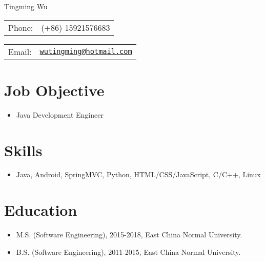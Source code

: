 \documentclass[letterpaper, UTF8]{article}
\def\name{Tingming Wu}
\begin{document}
	
	{\huge \name}
	
	
	\vspace{0.15in}  %
	
	\begin{minipage}{0.45\linewidth}
		\begin{tabular}{ll}
			Phone: & (+86) 15921576683 \\
		\end{tabular}
	\end{minipage}
	\begin{minipage}{0.45\linewidth}
		\begin{tabular}{ll}
			Email: & \href{mailto:wutingming@hotmail.com}{\tt wutingming@hotmail.com} \\
		\end{tabular}
	\end{minipage}
	\vspace{-0.1in}
	
	\section*{\textbf{Job Objective}}\vspace{-0.05in}
	\begin{itemize}
		\item Java Development Engineer
	\end{itemize}
	\vspace{-0.25in}
	
	\section*{\textbf{Skills}}\vspace{-0.05in}
	\begin{itemize}
		\item Java, Android, SpringMVC, Python, HTML/CSS/JavaScript, C/C++, Linux
	\end{itemize}
	\vspace{-0.32in}
	
	\section*{\textbf{Education}}\vspace{-0.05in}
	\begin{itemize}
		\item M.S. (Software Engineering), 2015-2018, East China Normal University.
		\item B.S. (Software Engineering), 2011-2015, East China Normal University.
	\end{itemize}	
	\vspace{-0.32in}
	
\end{document}
